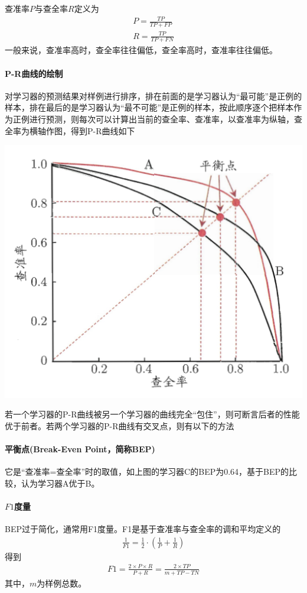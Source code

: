 查准率$P$与查全率$R$定义为
\begin{eqnarray}
P=\frac{TP}{TP+FP}\\
R=\frac{TP}{TP+FN}
\end{eqnarray}
一般来说，查准率高时，查全率往往偏低，查全率高时，查准率往往偏低。

\paragraph{P-R曲线的绘制}对学习器的预测结果对样例进行排序，排在前面的是学习器认为“最可能”是正例的样本，排在最后的是学习器认为“最不可能”是正例的样本，按此顺序逐个把样本作为正例进行预测，则每次可以计算出当前的查全率、查准率，以查准率为纵轴，查全率为横轴作图，得到P-R曲线如下
\begin{center}
\includegraphics[scale=0.8]{../figures/RAMS2.PNG} 
\end{center}
若一个学习器的P-R曲线被另一个学习器的曲线完全“包住”，则可断言后者的性能优于前者。若两个学习器的P-R曲线有交叉点，则有以下的方法
\paragraph{平衡点(Break-Even Point，简称BEP)}它是“查准率=查全率”时的取值，如上图的学习器C的BEP为0.64，基于BEP的比较，认为学习器A优于B。
\paragraph{$F1$度量}BEP过于简化，通常用F1度量。F1是基于查准率与查全率的调和平均定义的
\begin{eqnarray}
\frac{1}{F1}=\frac{1}{2}\cdot(\frac{1}{P}+\frac{1}{R})
\end{eqnarray}
得到
\begin{eqnarray}
F1=\frac{2\times P\times R}{P+R}=\frac{2\times TP}{m+TP-TN}
\end{eqnarray}
其中，$m$为样例总数。
